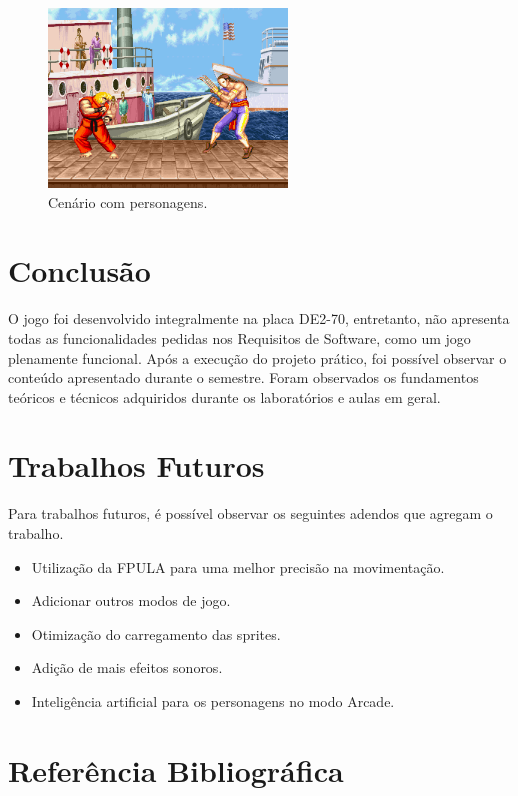 \documentclass{vgtc}                          %
\begin{document}
\begin{figure}[htbp]
  \centering
  \includegraphics[width=2.5in]{ken_battle.png}
 \caption{Cenário com personagens.}
\end{figure}





\section{Conclusão}

O jogo foi desenvolvido integralmente na placa DE2-70, entretanto, não apresenta todas as funcionalidades pedidas nos Requisitos de Software, como um jogo plenamente funcional. Após a execução do projeto prático, foi possível observar o conteúdo apresentado durante o semestre. Foram observados os fundamentos teóricos e técnicos adquiridos durante os laboratórios e aulas em geral.

\section{Trabalhos Futuros}

Para trabalhos futuros, é possível observar os seguintes adendos que agregam o trabalho.


\begin{itemize}
\item Utilização da FPULA para uma melhor precisão na movimentação.
\item Adicionar outros modos de jogo.
\item Otimização do carregamento das sprites.
\item Adição de mais efeitos sonoros.
\item Inteligência artificial para os personagens no modo Arcade. 
\end{itemize} 


\section{Referência Bibliográfica}
\end{document}
